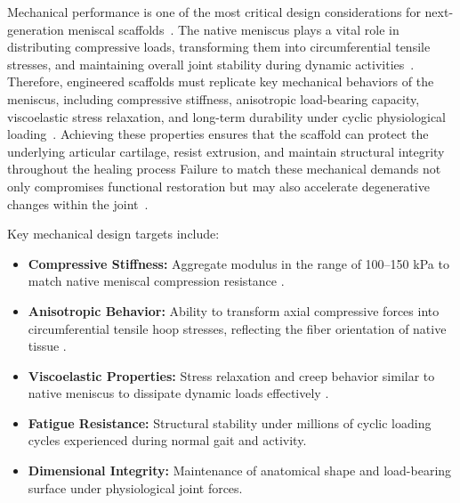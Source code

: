 Mechanical performance is one of the most critical design considerations for next-generation meniscal scaffolds~\cite{sun2017overviewscaffold, gupta2020meniscaltissue, ma2025structurallysophisticated}.
The native meniscus plays a vital role in distributing compressive loads, transforming them into circumferential tensile stresses, and maintaining overall joint stability during dynamic activities~\cite{makris2011kneemeniscus}.
Therefore, engineered scaffolds must replicate key mechanical behaviors of the meniscus, including compressive stiffness, anisotropic load-bearing capacity, viscoelastic stress relaxation, and long-term durability under cyclic physiological loading~\cite{seitz2013stressrelaxationresponse, a.murphy20243dprintedvariable, sun2017overviewscaffold}.
Achieving these properties ensures that the scaffold can protect the underlying articular cartilage, resist extrusion, and maintain structural integrity throughout the healing process\cite{patel2018tissueengineeredtotal, sun2017overviewscaffold}
Failure to match these mechanical demands not only compromises functional restoration but may also accelerate degenerative changes within the joint~\cite{ghodbane2019partialmeniscus, makris2011kneemeniscus}.

Key mechanical design targets include:

\begin{itemize}
    \item \textbf{Compressive Stiffness:} Aggregate modulus in the range of 100–150 kPa to match native meniscal compression resistance \cite{morejon2020compressiveproperties}.
    
    \item \textbf{Anisotropic Behavior:} Ability to transform axial compressive forces into circumferential tensile hoop stresses, reflecting the fiber orientation of native tissue
    \cite{makris2011kneemeniscus}.
    
    \item \textbf{Viscoelastic Properties:} Stress relaxation and creep behavior similar to native meniscus to dissipate dynamic loads effectively \cite{mordecai2014treatmentmeniscal}.
    
    \item \textbf{Fatigue Resistance:} Structural stability under millions of cyclic loading cycles experienced during normal gait and activity.
    
    \item \textbf{Dimensional Integrity:} Maintenance of anatomical shape and load-bearing surface under physiological joint forces.
\end{itemize}

